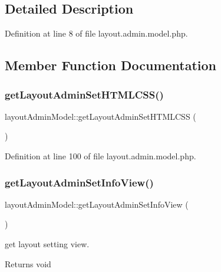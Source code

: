 \subsection{Detailed Description}


Definition at line 8 of file layout.\+admin.\+model.\+php.



\subsection{Member Function Documentation}
\mbox{\label{classlayoutAdminModel_a5757eaff4093fe8a359b4f3b5a6a2bff}} 
\subsubsection{\texorpdfstring{get\+Layout\+Admin\+Set\+H\+T\+M\+L\+C\+S\+S()}{getLayoutAdminSetHTMLCSS()}}
{\footnotesize\ttfamily layout\+Admin\+Model\+::get\+Layout\+Admin\+Set\+H\+T\+M\+L\+C\+SS (\begin{DoxyParamCaption}{ }\end{DoxyParamCaption})}



Definition at line 100 of file layout.\+admin.\+model.\+php.

\mbox{\label{classlayoutAdminModel_a7171578a8c44846e96b6330378152ddd}} 
\subsubsection{\texorpdfstring{get\+Layout\+Admin\+Set\+Info\+View()}{getLayoutAdminSetInfoView()}}
{\footnotesize\ttfamily layout\+Admin\+Model\+::get\+Layout\+Admin\+Set\+Info\+View (\begin{DoxyParamCaption}{ }\end{DoxyParamCaption})}

get layout setting view. \begin{DoxyReturn}{Returns}
void 
\end{DoxyReturn}



